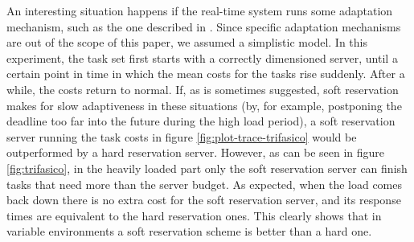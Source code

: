 \documentclass[times, 10pt,twocolumn]{article}
\begin{document}
An interesting situation happens if the real-time system runs some
adaptation mechanism, such as the one described in
\cite{abeni.ea05:qos}. Since specific adaptation mechanisms are out of
the scope of this paper, we assumed a simplistic model. In this
experiment, the task set first starts with a correctly dimensioned
server, until a certain point in time in which the mean costs for the
tasks rise suddenly. After a while, the costs return to normal. If, as
is sometimes suggested, soft reservation makes for slow adaptiveness
in these situations (by, for example, postponing the deadline too far
into the future during the high load period), a soft reservation
server running the task costs in figure \ref{fig:plot-trace-trifasico}
would be outperformed by a hard reservation server. However, as can be
seen in figure \ref{fig:trifasico}, in the heavily loaded part only
the soft reservation server can finish tasks that need more than the
server budget. As expected, when the load comes back down there is no
extra cost for the soft reservation server, and its response times are
equivalent to the hard reservation ones. This clearly shows that in
variable environments a soft reservation scheme is better than a hard
one.
\end{document}

